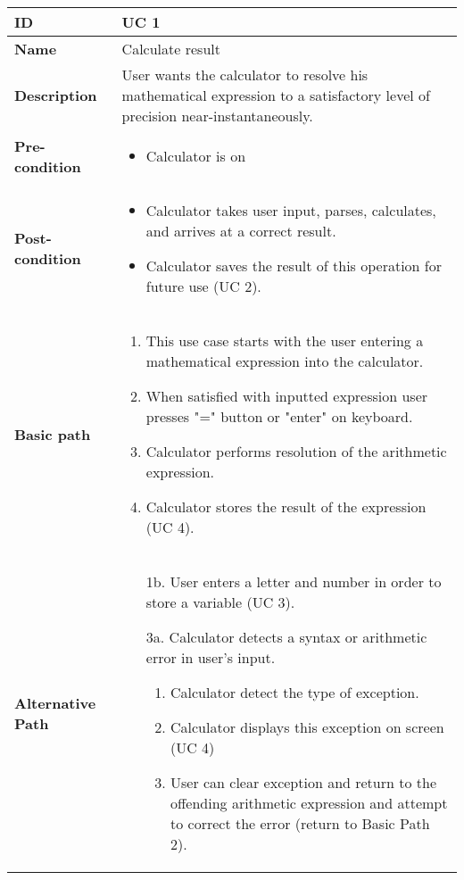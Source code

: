 \documentclass{article}
\begin{document}
\begin{table}[!h]
\begin{tabular}{|p{3cm}|p{9cm}|}
\hline
\textbf{ID} & UC 1  \\ \hline
\textbf{Name} & Calculate result  \\ \hline
\textbf{Description} & User wants the calculator to resolve his mathematical expression to a satisfactory level of precision near-instantaneously.  \\ \hline
\textbf{Pre-condition} &
	\begin{itemize}
		\vspace{-2mm}
		\item Calculator is on
		\vspace{-3.5mm}
	\end{itemize}  \\ \hline
\textbf{Post-condition} &
	\begin{itemize}
		\vspace{-2mm}
		\item Calculator takes user input, parses, calculates, and arrives at a correct result.
		\item Calculator saves the result of this operation for future use (UC 2).
		\vspace{-3.5mm}
	\end{itemize}  \\ \hline
\textbf{Basic path} &
	\begin{enumerate}
		\vspace{-2mm}
		\item This use case starts with the user entering a mathematical expression into the calculator.
		\item When satisfied with inputted expression user presses "=" button or "enter" on keyboard.
		\item Calculator performs resolution of the arithmetic expression.
		\item Calculator stores the result of the expression (UC 4).
		\vspace{-3.5mm}
	\end{enumerate}  \\ \hline
\textbf{Alternative Path} &
	\begin{itemize}[leftmargin=6mm]
		\vspace{-2mm}
		\item [1b.] User enters a letter and number in order to store a variable (UC 3).
		\item [3a.] Calculator detects a syntax or arithmetic error in user's input.
			\begin{enumerate}
				\item Calculator detect the type of exception.
				\item Calculator displays this exception on screen (UC 4)
				\item User can clear exception and return to the offending arithmetic expression and attempt to correct the error (return to Basic Path 2).
			\end{enumerate}
		

\end{itemize}
\end{tabular}
\end{table}
\end{document}
